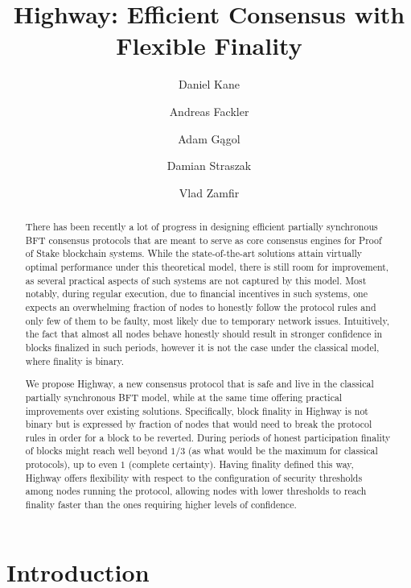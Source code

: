 \documentclass[12pt, fleqn]{article}
\title{Highway: Efficient Consensus with Flexible Finality}
\author[1]{Daniel Kane}
\author[2]{Andreas Fackler}
\author[3]{Adam Gągol}
\author[4]{Damian Straszak}
\author[5]{Vlad Zamfir}
\affil[1]{Computer Science and Engineering Department, UC San Diego}
\affil[2]{CasperLabs AG}
\affil[3,4]{Cardinal Cryptography}
\affil[5]{Ethereum Research}
\begin{document}
\maketitle

\begin{abstract}
There has been recently a lot of progress in designing efficient partially synchronous BFT consensus protocols that are meant to serve as core consensus engines for Proof of Stake blockchain systems.
% 
While the state-of-the-art solutions attain virtually optimal performance under this theoretical model, there is still room for improvement, as several practical aspects of such systems are not captured by this model.
%
Most notably, during regular execution, due to financial incentives in such systems, one expects an overwhelming fraction of nodes to honestly follow the protocol rules and only few of them to be faulty, most likely due to temporary network issues.
%
Intuitively, the fact that almost all nodes behave honestly should result in stronger confidence in blocks finalized in such periods, however it is not the case under the classical model, where finality is binary.
%

We propose Highway, a new consensus protocol that is safe and live in the classical partially synchronous BFT model, while at the same time offering practical improvements over existing solutions.
%
Specifically, block finality in Highway is not binary but is expressed by fraction of nodes that would need to break the protocol rules in order for a block to be reverted.
%
During periods of honest participation finality of blocks might reach well beyond $1/3$ (as what would be the maximum for classical protocols), up to even $1$ (complete certainty).
%
Having finality defined this way, Highway offers flexibility with respect to the configuration of security thresholds among nodes running the protocol, allowing nodes with lower thresholds to reach finality faster than the ones requiring higher levels of confidence.

\end{abstract}

\section{Introduction}
\end{document}

